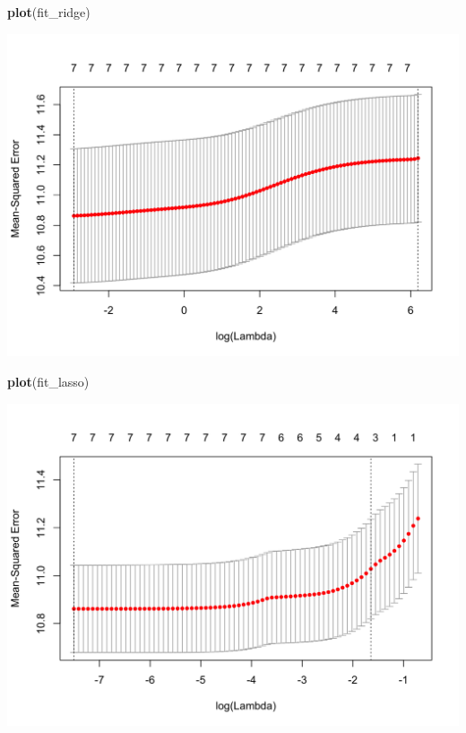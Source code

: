 \documentclass[]{tufte-book}
\newenvironment{Shaded}{}{}
\newcommand{\KeywordTok}[1]{\textcolor[rgb]{0.00,0.44,0.13}{\textbf{#1}}}
\newcommand{\NormalTok}[1]{#1}
\theoremstyle{definition}
\theoremstyle{definition}
\theoremstyle{remark}
\begin{document}
\begin{Shaded}
\begin{Highlighting}[]
\KeywordTok{plot}\NormalTok{(fit_ridge)}
\end{Highlighting}
\end{Shaded}

\includegraphics{_main_files/figure-latex/unnamed-chunk-107-1}

\begin{Shaded}
\begin{Highlighting}[]
\KeywordTok{plot}\NormalTok{(fit_lasso)}
\end{Highlighting}
\end{Shaded}

\includegraphics{_main_files/figure-latex/unnamed-chunk-107-2}
\end{document}
